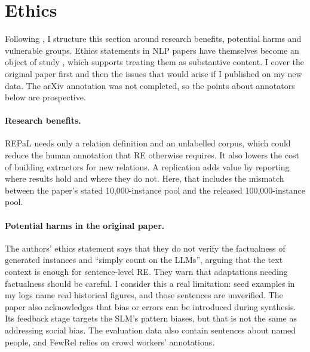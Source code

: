 \section{Ethics}
\label{sec:ethics}

Following \citet{benotti-blackburn-2022-ethics}, I structure this section around research benefits, potential harms and vulnerable groups. Ethics statements in NLP papers have themselves become an object of study \citep{karamolegkou-etal-2025-ethical}, which supports treating them as substantive content. I cover the original paper first and then the issues that would arise if I published on my new data. The arXiv annotation was not completed, so the points about annotators below are prospective.

\paragraph{Research benefits.} REPaL needs only a relation definition and an unlabelled corpus, which could reduce the human annotation that RE otherwise requires. It also lowers the cost of building extractors for new relations. A replication adds value by reporting where results hold and where they do not. Here, that includes the mismatch between the paper's stated 10,000-instance pool and the released 100,000-instance pool.

\paragraph{Potential harms in the original paper.} The authors' ethics statement says that they do not verify the factualness of generated instances and ``simply count on the LLMs'', arguing that the text context is enough for sentence-level RE. They warn that adaptations needing factualness should be careful. I consider this a real limitation: seed examples in my logs name real historical figures, and those sentences are unverified. The paper also acknowledges that bias or errors can be introduced during synthesis. Its feedback stage targets the SLM's pattern biases, but that is not the same as addressing social bias. The evaluation data also contain sentences about named people, and FewRel relies on crowd workers' annotations.

